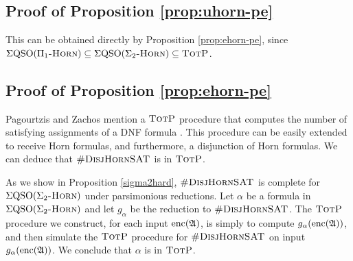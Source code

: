 \subsection*{Proof of Proposition \ref{prop:uhorn-pe}} %
This can be obtained directly by Proposition \ref{prop:ehorn-pe}, since $\Sigma{\rm QSO}(\Pi_1\textsc{-Horn})\subseteq\Sigma{\rm QSO}(\Sigma_2\textsc{-Horn})\subseteq\text{\sc TotP}$.










\subsection*{Proof of Proposition \ref{prop:ehorn-pe}}
Pagourtzis and Zachos mention a $\text{\sc TotP}$ procedure that computes the number of satisfying assignments of a DNF formula \cite{PagourtzisZ06}. This procedure can be easily extended to receive Horn formulas, and furthermore, a disjunction of Horn formulas. We can deduce that $\textsc{\#DisjHornSAT}$ is in $\text{\sc TotP}$.

As we show in Proposition \ref{sigma2hard}, $\textsc{\#DisjHornSAT}$ is complete for $\Sigma{\rm QSO}(\Sigma_2\textsc{-Horn})$ under parsimonious reductions. Let $\alpha$ be a formula in $\Sigma{\rm QSO}(\Sigma_2\textsc{-Horn})$ and let $g_{\alpha}$ be the reduction to $\textsc{\#DisjHornSAT}$. The $\text{\sc TotP}$ procedure we construct, for each input ${\rm enc}(\mathfrak{A})$, is simply to compute $g_{\alpha}({\rm enc}(\mathfrak{A}))$, and then simulate the $\text{\sc TotP}$ procedure for $\textsc{\#DisjHornSAT}$ on input $g_{\alpha}({\rm enc}(\mathfrak{A}))$. We conclude that $\alpha$ is in $\text{\sc TotP}$.










